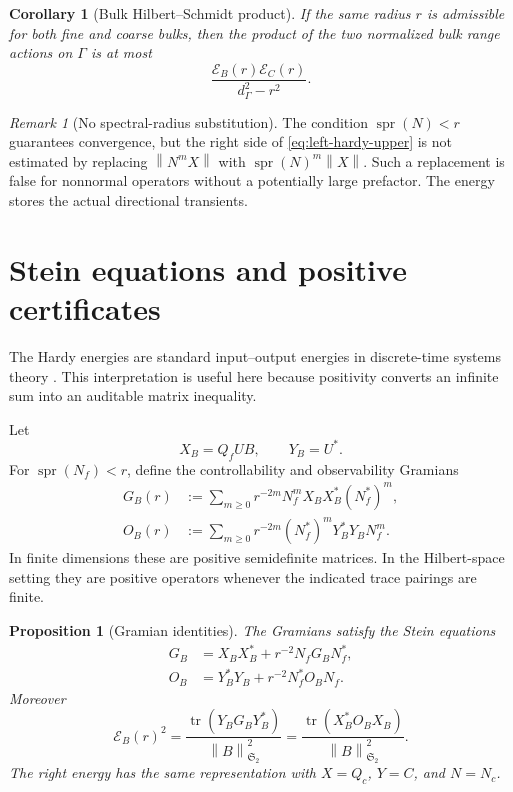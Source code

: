 \documentclass[11pt]{article}
\newtheorem{proposition}[theorem]{Proposition}
\newtheorem{corollary}[theorem]{Corollary}
\theoremstyle{definition}
\theoremstyle{remark}
\newtheorem{remark}[theorem]{Remark}
\newcommand{\cE}{\mathcal E}
\newcommand{\HS}{\mathfrak S_2}
\newcommand{\tr}{\operatorname{tr}}
\newcommand{\spr}{\operatorname{spr}}
\newcommand{\norm}[1]{\left\lVert #1\right\rVert}
\begin{document}
\begin{corollary}[Bulk Hilbert--Schmidt product]
\label{cor:bulk-product}
If the same radius \(r\) is admissible for both fine and coarse bulks, then
the product of the two normalized bulk range actions on \(\Gamma\) is at
most
\begin{equation}
 \frac{\cE_B(r)\cE_C(r)}{d_\Gamma^2-r^2}.
 \label{eq:bulk-product-upper}
\end{equation}
\end{corollary}

\begin{remark}[No spectral-radius substitution]
The condition \(\spr(N)<r\) guarantees convergence, but the right side of
\eqref{eq:left-hardy-upper} is not estimated by replacing
\(\norm{N^mX}\) with \(\spr(N)^m\norm X\).  Such a replacement is false for
nonnormal operators without a potentially large prefactor.  The energy
stores the actual directional transients.
\end{remark}

\section{Stein equations and positive certificates}
\label{sec:stein}

The Hardy energies are standard input--output energies in discrete-time
systems theory \citep{ZhouDoyleGlover1996,HornJohnson2013}.  This
interpretation is useful here because positivity converts an infinite sum
into an auditable matrix inequality.

Let
\begin{equation}
 X_B=Q_fUB,
 \qquad
 Y_B=U^*.
 \label{eq:XY}
\end{equation}
For \(\spr(N_f)<r\), define the controllability and observability Gramians
\begin{align}
 G_B(r)
 &:=
 \sum_{m\ge0}r^{-2m}
 N_f^mX_BX_B^*(N_f^*)^m,
 \label{eq:controllability}\\
 O_B(r)
 &:=
 \sum_{m\ge0}r^{-2m}
 (N_f^*)^mY_B^*Y_BN_f^m.
 \label{eq:observability}
\end{align}
In finite dimensions these are positive semidefinite matrices.  In the
Hilbert-space setting they are positive operators whenever the indicated
trace pairings are finite.

\begin{proposition}[Gramian identities]
\label{prop:gramian}
The Gramians satisfy the Stein equations
\begin{align}
 G_B
 &=X_BX_B^*+r^{-2}N_fG_BN_f^*,
 \label{eq:controllability-stein}\\
 O_B
 &=Y_B^*Y_B+r^{-2}N_f^*O_BN_f.
 \label{eq:observability-stein}
\end{align}
Moreover
\begin{equation}
 \boxed{
 \cE_B(r)^2
 =
 \frac{\tr(Y_BG_BY_B^*)}{\norm B_{\HS}^2}
 =
 \frac{\tr(X_B^*O_BX_B)}{\norm B_{\HS}^2}.}
 \label{eq:energy-trace}
\end{equation}
The right energy has the same representation with
\(X=Q_c\), \(Y=C\), and \(N=N_c\).
\end{proposition}
\end{document}
